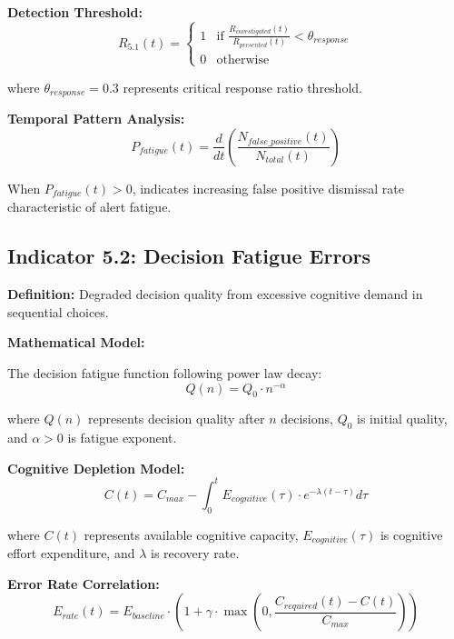 \documentclass[11pt,a4paper]{article}
\begin{document}
\textbf{Detection Threshold:}
\begin{equation}
R_{5.1}(t) = \begin{cases}
1 & \text{if } \frac{R_{investigated}(t)}{R_{presented}(t)} < \theta_{response} \\
0 & \text{otherwise}
\end{cases}
\end{equation}

where $\theta_{response} = 0.3$ represents critical response ratio threshold.

\textbf{Temporal Pattern Analysis:}
\begin{equation}
P_{fatigue}(t) = \frac{d}{dt}\left(\frac{N_{false\_positive}(t)}{N_{total}(t)}\right)
\end{equation}

When $P_{fatigue}(t) > 0$, indicates increasing false positive dismissal rate characteristic of alert fatigue.

\subsection{Indicator 5.2: Decision Fatigue Errors}

\textbf{Definition:} Degraded decision quality from excessive cognitive demand in sequential choices.

\textbf{Mathematical Model:}

The decision fatigue function following power law decay:
\begin{equation}
Q(n) = Q_0 \cdot n^{-\alpha}
\end{equation}

where $Q(n)$ represents decision quality after $n$ decisions, $Q_0$ is initial quality, and $\alpha > 0$ is fatigue exponent.

\textbf{Cognitive Depletion Model:}
\begin{equation}
C(t) = C_{max} - \int_0^t E_{cognitive}(\tau) \cdot e^{-\lambda(t-\tau)} d\tau
\end{equation}

where $C(t)$ represents available cognitive capacity, $E_{cognitive}(\tau)$ is cognitive effort expenditure, and $\lambda$ is recovery rate.

\textbf{Error Rate Correlation:}
\begin{equation}
E_{rate}(t) = E_{baseline} \cdot \left(1 + \gamma \cdot \max\left(0, \frac{C_{required}(t) - C(t)}{C_{max}}\right)\right)
\end{equation}
\end{document}
